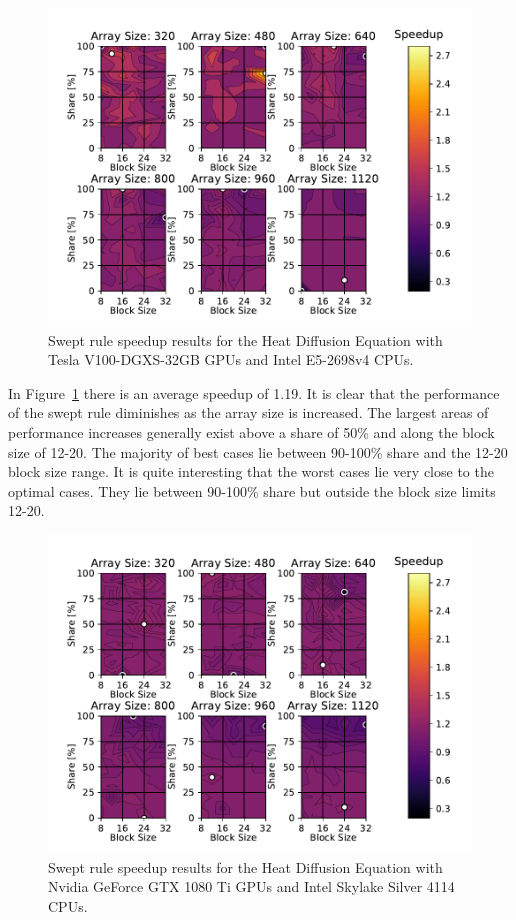 \documentclass[review]{elsarticle}
\def\oldCPU{s}
\def\oldGPU{s}
\def\newCPU{s}
\def\newGPU{s}
\def\oldCPU{Intel Skylake Silver 4114} %
\def\oldGPU{Nvidia GeForce GTX 1080 Ti}
\def\newCPU{Intel E5-2698v4} %
\def\newGPU{Tesla V100-DGXS-32GB}
\begin{document}
\begin{figure}[htb!]
    \centering
    \includegraphics[scale=0.7]{figs/speedUpheatNew.pdf}
    \caption{Swept rule speedup results for the Heat Diffusion Equation with \newGPU{} GPUs and \newCPU{} CPUs.}
    \label{fig:newSpeedupHeat}
\end{figure}

In Figure~\ref{fig:newSpeedupHeat} there is an average speedup of 1.19. It is clear that the performance of the swept rule diminishes as the array size is increased. The largest areas of performance increases generally exist above a share of 50\% and along the block size of 12-20. The majority of best cases lie between 90-100\% share and the 12-20 block size range. It is quite interesting that the worst cases lie very close to the optimal cases. They lie between 90-100\% share but outside the block size limits 12-20.

\begin{figure}[htb!]
    \centering
    \includegraphics[scale=0.7]{figs/speedUpheatOld.pdf}
    \caption{Swept rule speedup results for the Heat Diffusion Equation with \oldGPU{} GPUs and \oldCPU{} CPUs.}
    \label{fig:oldSpeedupHeat}
\end{figure}
\end{document}
